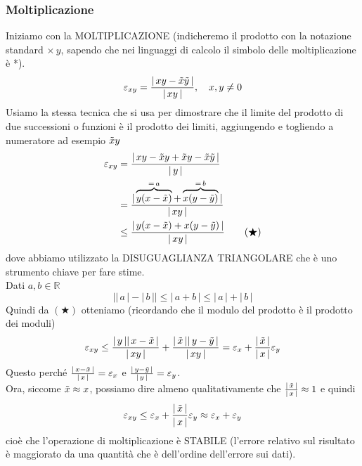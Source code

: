 \subsubsection{Moltiplicazione}
Iniziamo con la MOLTIPLICAZIONE (indicheremo il prodotto con la notazione standard $\times \, y$, sapendo che nei linguaggi di calcolo il simbolo delle moltiplicazione è *).
\[ \varepsilon_{xy} = \frac{\lvert \, xy - \Tilde{x}\Tilde{y} \, \rvert}{\lvert \, xy \, \rvert}, \quad x , y \ne 0 \]
Usiamo la stessa tecnica che si usa per dimostrare che il limite del prodotto di due successioni o funzioni è il prodotto dei limiti, aggiungendo e togliendo a numeratore ad esempio $\Tilde{x}y$
\[\begin{split}
    \varepsilon_{xy} & = \frac{\lvert \, xy - \Tilde{x}y + \Tilde{x}y - \Tilde{x}\Tilde{y} \, \rvert}{\lvert \, y \, \rvert} \\
    & = \frac{\lvert \, \overbrace{y(x - \Tilde{x})}^{=\,a} + \overbrace{x(y - \Tilde{y})}^{=\,b} \, \rvert}{\lvert\, xy \, \rvert} \\
    & \le \frac{\lvert \, y(x - \Tilde{x}) + x(y - \Tilde{y}) \, \rvert}{\lvert \, xy \, \rvert} \quad \quad (\bigstar) 
\end{split}\]
dove abbiamo utilizzato la DISUGUAGLIANZA TRIANGOLARE che è uno strumento chiave per fare stime.\\
Dati $a, b \in \mathbb{R}$
\[ \lvert \lvert \, a \, \rvert - \lvert \, b \, \rvert \rvert \le \lvert \, a + b \, \rvert \le \lvert \, a \, \rvert + \lvert \, b \, \rvert\] 
Quindi da $(\bigstar)$ otteniamo (ricordando che il modulo del prodotto è il prodotto dei moduli)
\[ \varepsilon_{xy} \le \frac{\lvert \,y\, \rvert \lvert \,x - \Tilde{x}\, \rvert}{\lvert \,xy\, \rvert} + \frac{\lvert \,\Tilde{x}\, \rvert \lvert \,y - \Tilde{y}\, \rvert}{\lvert \,xy\, \rvert} = \varepsilon_x + \frac{\lvert \,\Tilde{x}\, \rvert}{\lvert \,x\, \rvert} \varepsilon_y\]
Questo perché $\frac{\lvert \,x - \Tilde{x}\, \rvert}{\lvert \,x\, \rvert} = \varepsilon_x$ e $\frac{\lvert \,y - \Tilde{y}\, \rvert}{\lvert \,y\, \rvert} = \varepsilon_y$.\\
Ora, siccome $\Tilde{x} \approx x$, possiamo dire almeno qualitativamente che $\frac{\lvert \,\Tilde{x}\, \rvert}{\lvert \,x\, \rvert} \approx 1$ e quindi 
\[ \varepsilon_{xy} \le \varepsilon_x + \frac{\lvert \,\Tilde{x}\, \rvert}{\lvert \,x\, \rvert} \varepsilon_y \approx \varepsilon_x + \varepsilon_y \]
cioè che l'operazione di moltiplicazione è STABILE (l'errore relativo sul risultato è maggiorato da una quantità che è dell'ordine dell'errore sui dati).\\
